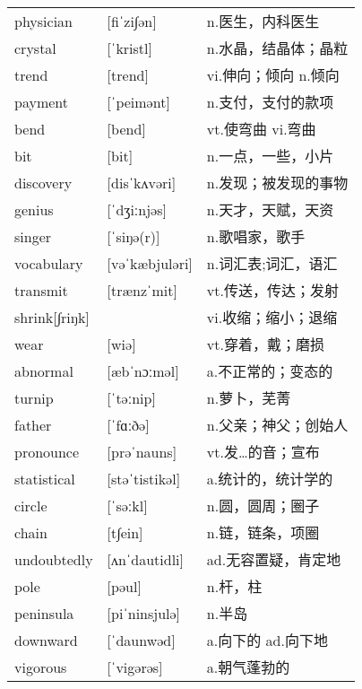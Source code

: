 \documentclass[a4paper]{article}
\begin{document}
\section{}
\begin{tabular}{l l l}

physician & [fiˈzi∫ən] & n.医生，内科医生 \\
crystal & [ˈkristl] & n.水晶，结晶体；晶粒 \\
trend & [trend] & vi.伸向；倾向 n.倾向 \\
payment & [ˈpeimənt] & n.支付，支付的款项 \\
bend & [bend] & vt.使弯曲 vi.弯曲 \\
bit & [bit] & n.一点，一些，小片 \\
discovery & [disˈkʌvəri] & n.发现；被发现的事物 \\
genius & [ˈdʒiːnjəs] & n.天才，天赋，天资 \\
singer & [ˈsiŋə(r)] & n.歌唱家，歌手 \\
vocabulary & [vəˈkæbjuləri] & n.词汇表;词汇，语汇 \\
transmit & [trænzˈmit] & vt.传送，传达；发射 \\
shrink[∫riŋk] &  & vi.收缩；缩小；退缩 \\
wear & [wiə] & vt.穿着，戴；磨损 \\
abnormal & [æbˈnɔːməl] & a.不正常的；变态的 \\
turnip & [ˈtəːnip] & n.萝卜，芜菁 \\
father & [ˈfɑːðə] & n.父亲；神父；创始人 \\
pronounce & [prəˈnauns] & vt.发…的音；宣布 \\
statistical & [stəˈtistikəl] & a.统计的，统计学的 \\
circle & [ˈsəːkl] & n.圆，圆周；圈子 \\
chain & [t∫ein] & n.链，链条，项圈 \\
undoubtedly & [ʌnˈdautidli] & ad.无容置疑，肯定地 \\
pole & [pəul] & n.杆，柱 \\
peninsula & [piˈninsjulə] & n.半岛 \\
downward & [ˈdaunwəd] & a.向下的 ad.向下地 \\
vigorous & [ˈvigərəs] & a.朝气蓬勃的 \\

\end{tabular}
\end{document}
